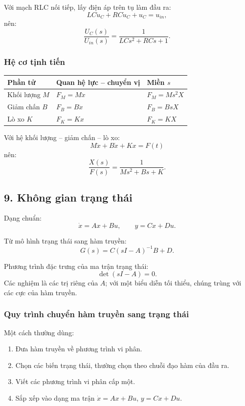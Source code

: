 Với mạch RLC nối tiếp, lấy điện áp trên tụ làm đầu ra:
\[
LC\ddot u_C+RC\dot u_C+u_C=u_{in},
\]
nên:
\[
\boxed{
\frac{U_C(s)}{U_{in}(s)}
=
\frac{1}{LCs^2+RCs+1}.
}
\]

\subsubsection*{Hệ cơ tịnh tiến}

\begin{center}
\small
\begin{tabular}{|p{}|p{}|p{}|}
\hline
\textbf{Phần tử} & \textbf{Quan hệ lực -- chuyển vị} & \textbf{Miền $s$}\\
\hline
Khối lượng $M$ & $F_M=M\ddot x$ & $F_M=Ms^2X$\\
\hline
Giảm chấn $B$ & $F_B=B\dot x$ & $F_B=BsX$\\
\hline
Lò xo $K$ & $F_K=Kx$ & $F_K=KX$\\
\hline
\end{tabular}
\end{center}

Với hệ khối lượng -- giảm chấn -- lò xo:
\[
M\ddot x+B\dot x+Kx=F(t)
\]
nên:
\[
\boxed{\frac{X(s)}{F(s)}=\frac{1}{Ms^2+Bs+K}}.
\]

\subsection*{9. Không gian trạng thái}

Dạng chuẩn:
\[
\boxed{
\dot x=Ax+Bu,\qquad y=Cx+Du.
}
\]

Từ mô hình trạng thái sang hàm truyền:
\[
\boxed{G(s)=C(sI-A)^{-1}B+D}.
\]

Phương trình đặc trưng của ma trận trạng thái:
\[
\boxed{\det(sI-A)=0}.
\]
Các nghiệm là các trị riêng của $A$; với một biểu diễn tối thiểu, chúng trùng với các cực của hàm truyền.

\subsubsection*{Quy trình chuyển hàm truyền sang trạng thái}

Một cách thường dùng:
\begin{enumerate}[leftmargin=1.9em,itemsep=0.2em]
  \item Đưa hàm truyền về phương trình vi phân.
  \item Chọn các biến trạng thái, thường chọn theo chuỗi đạo hàm của đầu ra.
  \item Viết các phương trình vi phân cấp một.
  \item Sắp xếp vào dạng ma trận $\dot x=Ax+Bu$, $y=Cx+Du$.
\end{enumerate}

